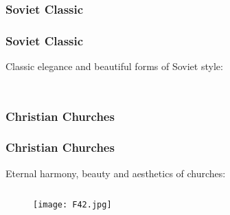 \documentclass[pdflatex,compress,8pt,
	xcolor={dvipsnames,dvipsnames,svgnames,x11names,table},
	hyperref={colorlinks = true,breaklinks = true, urlcolor = NavyBlue, breaklinks = true}]{beamer}
\begin{document}
\subsubsection{Soviet Classic}
\begin{frame}\frametitle{Soviet Classic}
Classic elegance and beautiful forms of Soviet style:
\begin{minipage}[0.4\textheight]{\textwidth}
\begin{columns}[T]
\begin{column}{0.5\textwidth}
\begin{figure}[H]
	\centering
			\vspace{2mm}
\end{figure}
\end{column}
\begin{column}{0.5\textwidth}
\begin{figure}[H]
	\centering
			\vspace{2mm}
\end{figure}
\end{column}
\end{columns}
\end{minipage}
\end{frame}

\subsubsection{Christian Churches}
\begin{frame}\frametitle{Christian Churches}
Eternal harmony, beauty and aesthetics of churches:
\begin{minipage}[0.4\textheight]{\textwidth}
\begin{columns}[T]
\begin{column}{0.5\textwidth}
\begin{figure}[H]
	\centering
		\texttt{[image: F42.jpg]}
\end{figure}
\end{column}
\begin{column}{0.5\textwidth}
\begin{figure}[H]
	\centering
			\hspace{5mm}
\end{figure}
\end{column}
\end{columns}
\end{minipage}
\end{frame}
\end{document}
